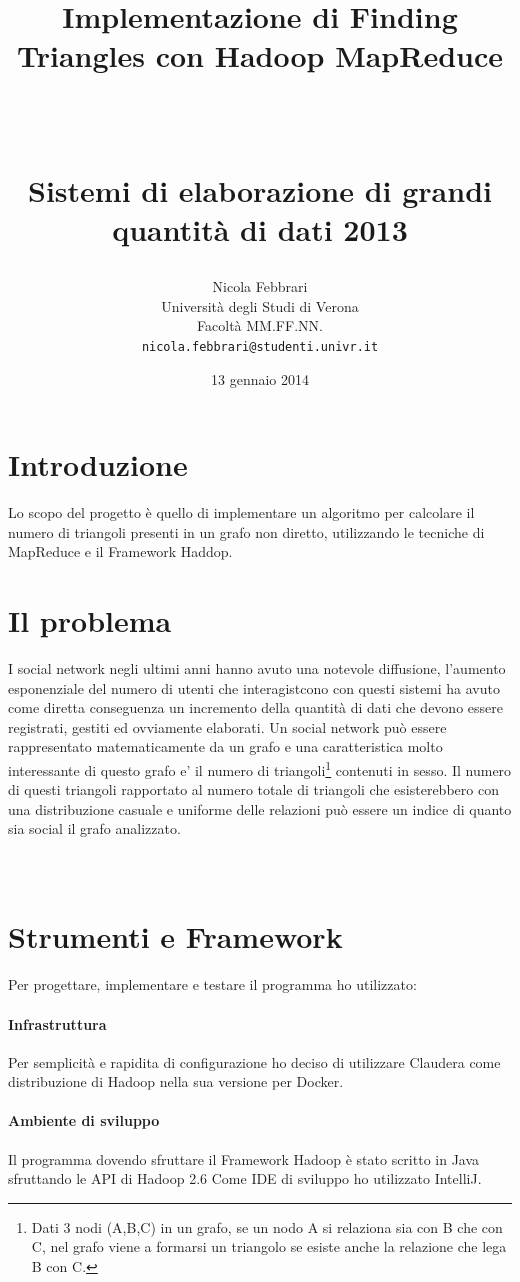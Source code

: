 \documentclass[paper=a4, fontsize=11pt]{scrartcl}	%
\title{ \vspace{-1in} 	\usefont{OT1}{bch}{b}{n}
		\huge \strut Implementazione di Finding Triangles con Hadoop MapReduce\strut \\
		\Large \bfseries \strut Sistemi di elaborazione di grandi quantità di dati 2013 \strut
}
\author{ 									\usefont{OT1}{bch}{m}{n}
        Nicola Febbrari\\		\usefont{OT1}{bch}{m}{n}
        Università degli Studi di Verona\\	\usefont{OT1}{bch}{m}{n}
        Facoltà MM.FF.NN.\\
        \texttt{nicola.febbrari@studenti.univr.it}
}
\date{13 gennaio 2014}
\numberwithin{equation}{section}															%
\numberwithin{figure}{section}																%
\numberwithin{table}{section}																%
\begin{document}
\maketitle
\section{Introduzione}
Lo scopo del progetto è quello di implementare un algoritmo per calcolare il numero di triangoli presenti in un grafo non diretto, utilizzando le tecniche di MapReduce e il Framework Haddop.


\section{Il problema}
I social network negli ultimi anni hanno avuto una notevole diffusione, l'aumento esponenziale del numero di utenti che interagistcono con questi sistemi 
ha avuto come diretta conseguenza un  incremento della quantità di dati che devono essere registrati, gestiti ed ovviamente elaborati.
Un social network può essere rappresentato matematicamente da un grafo e una caratteristica molto interessante di questo grafo e' il numero di 
triangoli\footnote{Dati 3 nodi (A,B,C) in un grafo, se un nodo A si relaziona sia con B che con C, nel grafo viene a formarsi un triangolo se esiste anche la relazione che lega B con C.} 
contenuti in sesso. 
Il numero di questi triangoli rapportato al numero totale di triangoli che esisterebbero con una distribuzione casuale e uniforme delle relazioni può essere un indice di quanto sia social il grafo analizzato.\\
\\
\\
\section{Strumenti e Framework}
Per progettare, implementare e testare il programma ho utilizzato:
\paragraph{Infrastruttura}
Per semplicità e rapidita di configurazione ho deciso di utilizzare Claudera come distribuzione di Hadoop nella sua versione per Docker.

\paragraph{Ambiente di sviluppo}
Il programma dovendo sfruttare il Framework Hadoop è stato scritto in Java sfruttando le API di Hadoop 2.6 Come IDE di sviluppo ho utilizzato IntelliJ.  
\end{document}
